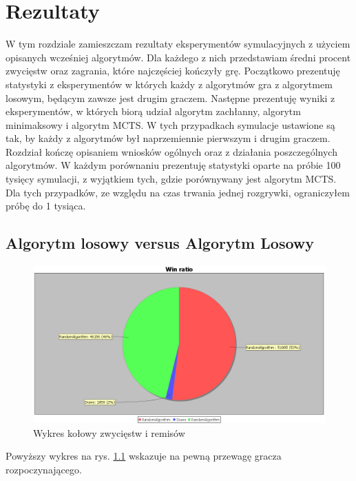 \chapter{Rezultaty}
\label{cha:rozdz5}

W tym rozdziale zamieszczam rezultaty eksperymentów symulacyjnych z użyciem opisanych wcześniej algorytmów. Dla każdego z nich przedstawiam średni procent zwycięstw oraz zagrania, które najczęściej kończyły grę. Początkowo prezentuję statystyki z eksperymentów w których każdy z algorytmów gra z algorytmem losowym, będącym zawsze jest drugim graczem. Następne prezentuję wyniki z eksperymentów, w których biorą udział algorytm zachłanny, algorytm minimaksowy i algorytm MCTS. W tych przypadkach symulacje ustawione są tak, by każdy z algorytmów był naprzemiennie pierwszym i drugim graczem. Rozdział kończę opisaniem wniosków ogólnych oraz z działania poszczególnych algorytmów.
W każdym porównaniu prezentuję statystyki oparte na próbie 100 tysięcy symulacji, z wyjątkiem tych, gdzie porównywany jest algorytm MCTS. Dla tych przypadków, ze względu na czas trwania jednej rozgrywki, ograniczyłem próbę do 1 tysiąca.

\section{Algorytm losowy versus Algorytm Losowy}

\begin{figure}[H]
	\centering
	\includegraphics[width=\textwidth]{Resources/RVsR/RVsRwin.PNG}
	\caption{Wykres kołowy zwycięstw i remisów} 
	\label{fig:RVsRwin}
\end{figure}

Powyższy wykres na rys. \ref{fig:RVsRwin} wskazuje na pewną przewagę gracza rozpoczynającego.

